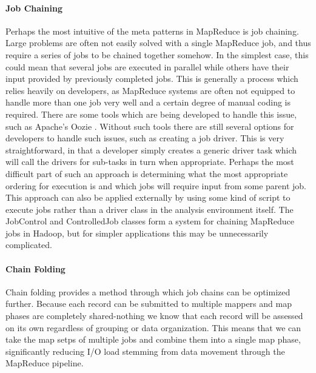 \paragraph{Job Chaining}
Perhaps the most intuitive of the meta patterns in MapReduce is job chaining. Large problems are often not easily solved with a single MapReduce job, and thus require a series of jobs to be chained together somehow. In the simplest case, this could mean that several jobs are executed in parallel while others have their input provided by previously completed jobs. This is generally a process which relies heavily on developers, as MapReduce systems are often not equipped to handle more than one job very well and a certain degree of manual coding is required. There are some tools which are being developed to handle this issue, such as Apache's Oozie \cite{Islam2012}. Without such tools there are still several options for developers to handle such issues, such as creating  a job driver. This is very straightforward, in that a developer simply creates a generic driver task which will call the drivers for sub-tasks in turn when appropriate. Perhaps the most difficult part of such an approach is determining what the most appropriate ordering for execution is and which jobs will require input from some parent job. This approach can also be applied externally by using some kind of script to execute jobs rather than a driver class in the analysis environment itself. The JobControl and ControlledJob classes form a system for chaining MapReduce jobs in Hadoop, but for simpler applications this may be unnecessarily complicated. 

\paragraph{Chain Folding}
Chain folding provides a method through which job chains can be optimized further. Because each record can be submitted to multiple mappers and map phases are completely shared-nothing we know that each record will be assessed on its own regardless of grouping or data organization. This means that we can take the map setps of multiple jobs and combine them into a single map phase, significantly reducing I/O load stemming from data movement through the MapReduce pipeline.  

